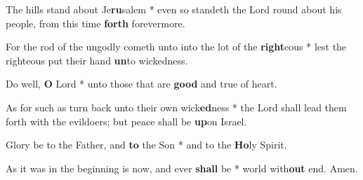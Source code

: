 \begin{multicols}{2}
	The hills stand about Je\textbf{ru}salem * even so standeth the Lord round about his people, from this time \textbf{forth} forevermore.
	
	For the rod of the ungodly cometh unto into the lot of the \textbf{right}eous * lest the righteous put their hand \textbf{un}to wickedness.
	
	Do well, \textbf{O} Lord * unto those that are \textbf{good} and true of heart.
	
	As for such as turn back unto their own wick\textbf{ed}ness * the Lord shall lead them forth with the evildoers; but peace shall be \textbf{up}on Israel.
	
	Glory be to the Father, and \textbf{to} the Son * and to the \textbf{Ho}ly Spirit.
	
	As it was in the beginning is now, and ever \textbf{shall} be * world with\textbf{out} end. Amen.
\end{multicols}